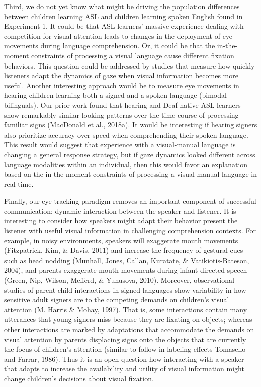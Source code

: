 \documentclass[oneside]{report}
\begin{document}
Third, we do not yet know what might be driving the population
differences between children learning ASL and children learning spoken
English found in Experiment 1. It could be that ASL-learners' massive
experience dealing with competition for visual attention leads to
changes in the deployment of eye movements during language
comprehension. Or, it could be that the in-the-moment constraints of
processing a visual language cause different fixation behaviors. This
question could be addressed by studies that measure how quickly
listeners adapt the dynamics of gaze when visual information becomes
more useful. Another interesting approach would be to measure eye
movements in hearing children learning both a signed and a spoken
language (bimodal bilinguals). Our prior work found that hearing and
Deaf native ASL learners show remarkably similar looking patterns over
the time course of processing familiar signs (MacDonald et al., 2018a).
It would be interesting if hearing signers also prioritize accuracy over
speed when comprehending their spoken language. This result would
suggest that experience with a visual-manual language is changing a
general response strategy, but if gaze dynamics looked different across
language modalities within an individual, then this would favor an
explanation based on the in-the-moment constraints of processing a
visual-manual language in real-time.

Finally, our eye tracking paradigm removes an important component of
successful communication: dynamic interaction between the speaker and
listener. It is interesting to consider how speakers might adapt their
behavior present the listener with useful visual information in
challenging comprehension contexts. For example, in noisy environments,
speakers will exaggerate mouth movements (Fitzpatrick, Kim, \& Davis,
2011) and increase the frequency of gestural cues such as head nodding
(Munhall, Jones, Callan, Kuratate, \& Vatikiotis-Bateson, 2004), and
parents exaggerate mouth movements during infant-directed speech (Green,
Nip, Wilson, Mefferd, \& Yunusova, 2010). Moreover, observational
studies of parent-child interactions in signed languages show
variability in how sensitive adult signers are to the competing demands
on children's visual attention (M. Harris \& Mohay, 1997). That is, some
interactions contain many utterances that young signers miss because
they are fixating on objects; whereas other interactions are marked by
adaptations that accommodate the demands on visual attention by parents
displacing signs onto the objects that are currently the focus of
children's attention (similar to follow-in labeling effects Tomasello
and Farrar, 1986). Thus it is an open question how interacting with a
speaker that adapts to increase the availability and utility of visual
information might change children's decisions about visual fixation.
\end{document}
